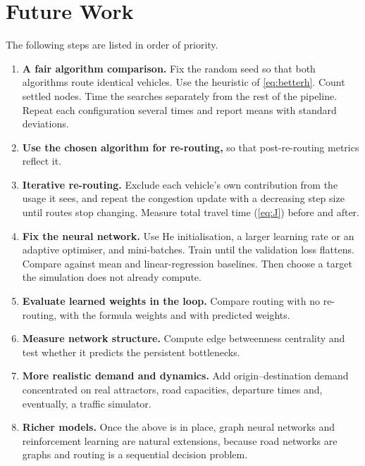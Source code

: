 \documentclass[12pt]{report}
\begin{document}

\chapter{Future Work}
\label{ch:future}

The following steps are listed in order of priority.

\begin{enumerate}
  \item \textbf{A fair algorithm comparison.} Fix the random seed so that both algorithms route identical vehicles. Use the heuristic of \cref{eq:betterh}. Count settled nodes. Time the searches separately from the rest of the pipeline. Repeat each configuration several times and report means with standard deviations.
  \item \textbf{Use the chosen algorithm for re-routing,} so that post-re-routing metrics reflect it.
  \item \textbf{Iterative re-routing.} Exclude each vehicle's own contribution from the usage it sees, and repeat the congestion update with a decreasing step size until routes stop changing. Measure total travel time (\cref{eq:J}) before and after.
  \item \textbf{Fix the neural network.} Use He initialisation, a larger learning rate or an adaptive optimiser, and mini-batches. Train until the validation loss flattens. Compare against mean and linear-regression baselines. Then choose a target the simulation does not already compute.
  \item \textbf{Evaluate learned weights in the loop.} Compare routing with no re-routing, with the formula weights and with predicted weights.
  \item \textbf{Measure network structure.} Compute edge betweenness centrality and test whether it predicts the persistent bottlenecks.
  \item \textbf{More realistic demand and dynamics.} Add origin--destination demand concentrated on real attractors, road capacities, departure times and, eventually, a traffic simulator.
  \item \textbf{Richer models.} Once the above is in place, graph neural networks \citep{jiang2022gnn} and reinforcement learning \citep{sutton2018reinforcement} are natural extensions, because road networks are graphs and routing is a sequential decision problem.
\end{enumerate}
\end{document}
